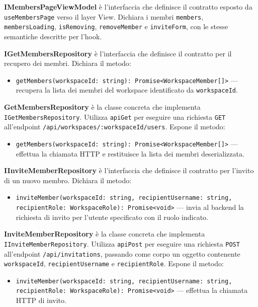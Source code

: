 \documentclass[a4paper, 11pt]{article}
\newcounter{subsubsubsection}[subsubsection]
\newcounter{subsubsubsubsection}[subsubsubsection]
\begin{document}
\textbf{IMembersPageViewModel} è l'interfaccia che definisce il contratto esposto da
\texttt{useMembersPage} verso il layer View. Dichiara i membri \texttt{members},
\texttt{membersLoading}, \texttt{isRemoving}, \texttt{removeMember} e \texttt{inviteForm},
con le stesse semantiche descritte per l'hook.


\textbf{IGetMembersRepository} è l'interfaccia che definisce il contratto per il recupero dei
membri. Dichiara il metodo:
\begin{itemize}
  \item \texttt{getMembers(workspaceId: string): Promise<WorkspaceMember[]>} — recupera la lista
        dei membri del workspace identificato da \texttt{workspaceId}.
\end{itemize}

\textbf{GetMembersRepository} è la classe concreta che implementa \texttt{IGetMembersRepository}.
Utilizza \texttt{apiGet} per eseguire una richiesta \texttt{GET} all'endpoint
\texttt{/api/workspaces/:workspaceId/users}. Espone il metodo:
\begin{itemize}
  \item \texttt{getMembers(workspaceId: string): Promise<WorkspaceMember[]>} — effettua la
        chiamata HTTP e restituisce la lista dei membri deserializzata.
\end{itemize}

\textbf{IInviteMemberRepository} è l'interfaccia che definisce il contratto per l'invito di un
nuovo membro. Dichiara il metodo:
\begin{itemize}
  \item \texttt{inviteMember(workspaceId: string, recipientUsername: string, recipientRole:
        WorkspaceRole): Promise<void>} — invia al backend la richiesta di invito per l'utente
        specificato con il ruolo indicato.
\end{itemize}

\textbf{InviteMemberRepository} è la classe concreta che implementa
\texttt{IInviteMemberRepository}. Utilizza \texttt{apiPost} per eseguire una richiesta
\texttt{POST} all'endpoint \texttt{/api/invitations}, passando come corpo un oggetto contenente
\texttt{workspaceId}, \texttt{recipientUsername} e \texttt{recipientRole}. Espone il metodo:
\begin{itemize}
  \item \texttt{inviteMember(workspaceId: string, recipientUsername: string, recipientRole:
        WorkspaceRole): Promise<void>} — effettua la chiamata HTTP di invito.
\end{itemize}
\end{document}
